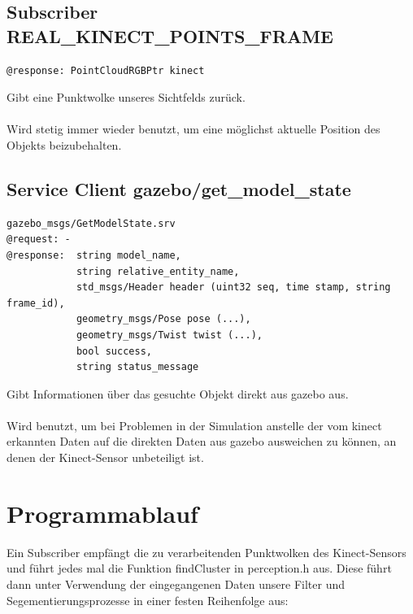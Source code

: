\documentclass{suturo}
\begin{document}
\subsection*{Subscriber REAL\_KINECT\_POINTS\_FRAME}
\begin{verbatim}
@response: PointCloudRGBPtr kinect
\end{verbatim}
Gibt eine Punktwolke unseres Sichtfelds zurück.
\\ \\
Wird stetig immer wieder benutzt, um eine möglichst aktuelle Position des Objekts beizubehalten.

\subsection*{Service Client gazebo/get\_model\_state}
\begin{verbatim}
gazebo_msgs/GetModelState.srv
@request: -
@response:  string model_name,
            string relative_entity_name,
            std_msgs/Header header (uint32 seq, time stamp, string frame_id),
            geometry_msgs/Pose pose (...),
            geometry_msgs/Twist twist (...),
            bool success,
            string status_message
\end{verbatim}
Gibt Informationen über das gesuchte Objekt direkt aus gazebo aus.
\\ \\
Wird benutzt, um bei Problemen in der Simulation anstelle der vom kinect erkannten Daten auf die direkten Daten aus gazebo ausweichen zu können, an denen der Kinect-Sensor unbeteiligt ist.

\section*{Programmablauf}

Ein Subscriber empfängt die zu verarbeitenden Punktwolken des Kinect-Sensors und führt jedes mal die Funktion findCluster in perception.h aus. Diese führt dann unter Verwendung der eingegangenen Daten unsere Filter und Segementierungsprozesse in einer festen Reihenfolge aus:
\end{document}
